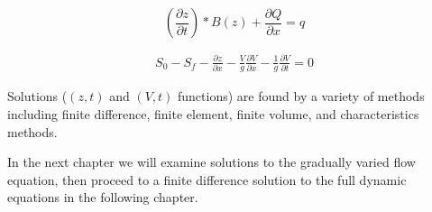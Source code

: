 \begin{equation}
( \frac{\partial z}{\partial t}) *B(z) + \frac{\partial Q}{\partial x} = q
\label{eqn:continunity}
\end{equation}

\begin{equation}
\begin{split}
S_0 - S_f  -  \frac{\partial z}{\partial x} - \frac{V}{g}\frac{\partial V}{\partial x}
- \frac{1}{g}\frac{\partial V }{\partial t} = 0
\end{split}
\label{eqn:momentum_complete}
\end{equation}


Solutions ($(z,t)$ and $(V,t)$ functions) are found by a variety of methods including finite difference, finite element, finite volume, and characteristics methods.

In the next chapter we will examine solutions to the gradually varied flow equation, then proceed to a finite difference solution to the full dynamic equations in the following chapter.




